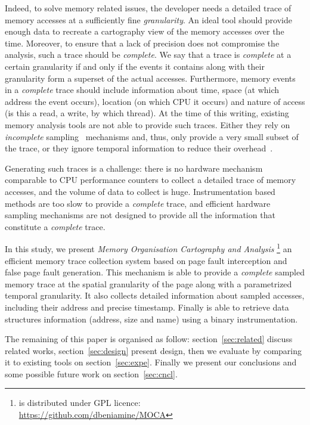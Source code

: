 Indeed, to solve memory related issues, the developer needs a detailed trace of memory
accesses at a sufficiently fine \emph{granularity}.
An ideal tool should provide enough data to recreate a cartography view
of the memory accesses over the time.
Moreover, to ensure that a lack of precision
does not compromise the analysis, such a trace should be \emph{complete}. We say that a trace is
\emph{complete} at a certain granularity if and only if the events it contains along with their granularity
form a superset of the actual accesses. Furthermore, memory events in a \emph{complete} trace should
include information about time, space (at which address the event occurs),
location (on which CPU it occurs) and nature of access (is this
a read, a write, by which thread).
At the time of this writing, existing memory analysis tools are not able to provide such traces.
Either they rely on \emph{incomplete} sampling~\cite{Liu14Tool,Lachaize12MemProf}
mechanisms and, thus, only provide a very small subset of the trace, or they
ignore temporal information to reduce their
overhead~\cite{Beniamine15TABARNACRR}.

Generating such traces is a challenge: there is no hardware mechanism
comparable to CPU performance counters to collect a detailed trace of memory accesses, and the volume
of data to collect is huge. Instrumentation based methods are too slow
to provide a \emph{complete} trace, and efficient hardware sampling mechanisms are not designed
to provide all the information that constitute a \emph{complete} trace.

In this study, we present \emph{Memory Organisation Cartography and Analysis}
\footnote{\Moca is distributed under GPL licence:\\
    \url{https://github.com/dbeniamine/MOCA}}
an efficient memory trace collection system based on page fault interception
and false page fault generation.
This mechanism is able to provide a \emph{complete} sampled memory trace at
the spatial granularity of the page along with a parametrized temporal granularity.
It also collects detailed information about sampled accesses, including their address and
precise timestamp. Finally \Moca is able to retrieve data structures
information (address, size and name) using a binary instrumentation.

The remaining of this paper is organised as follow: section~\ref{sec:related}
discuss related works, section~\ref{sec:design} present \Moca design, then we
evaluate \Moca by comparing it to existing tools on section~\ref{sec:expe}.
Finally we present our conclusions and some possible future work on
section~\ref{sec:cncl}.
